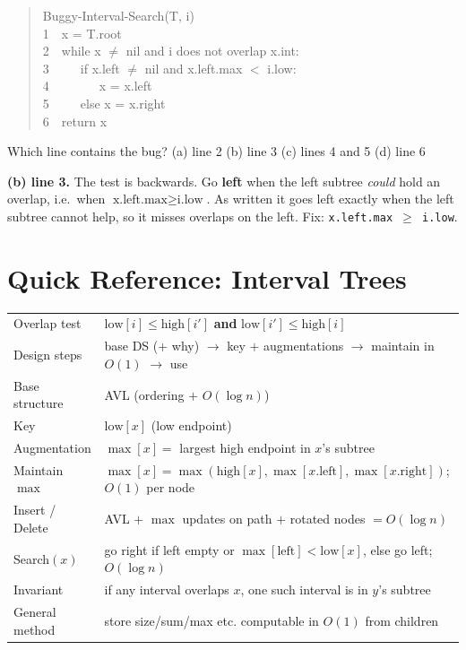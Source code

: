 \documentclass[11pt]{article}
\begin{document}
\begin{exambox}
\begin{quote}\ttfamily
Buggy-Interval-Search(T, i)\\
1\ \ x = T.root\\
2\ \ while x $\ne$ nil and i does not overlap x.int:\\
3\ \ \ \ \ if x.left $\ne$ nil and x.left.max $<$ i.low:\\
4\ \ \ \ \ \ \ \ x = x.left\\
5\ \ \ \ \ else x = x.right\\
6\ \ return x
\end{quote}
Which line contains the bug? \quad (a) line 2 \quad (b) line 3 \quad (c) lines 4 and 5 \quad (d) line 6

\begin{answerband}
\textbf{(b) line 3.} The test is backwards. Go \textbf{left} when the left subtree \emph{could} hold an overlap, i.e.\ when $\text{x.left.max}\geq\text{i.low}$. As written it goes left exactly when the left subtree cannot help, so it misses overlaps on the left. Fix: \texttt{x.left.max $\geq$ i.low}.
\end{answerband}
\end{exambox}

\section*{\textcolor{violetT}{Quick Reference: Interval Trees}}
\begin{keybox}
\renewcommand{\arraystretch}{1.4}
\begin{tabular}{l l}
Overlap test & $\text{low}[i] \le \text{high}[i']$ \textbf{and} $\text{low}[i'] \le \text{high}[i]$\\
Design steps & base DS (+ why) $\to$ key $+$ augmentations $\to$ maintain in $O(1)$ $\to$ use\\
Base structure & AVL (ordering $+$ $O(\log n)$)\\
Key & $\text{low}[x]$ (low endpoint)\\
Augmentation & $\max[x] = $ largest high endpoint in $x$'s subtree\\
Maintain $\max$ & $\max[x] = \max(\text{high}[x], \max[x.\text{left}], \max[x.\text{right}])$; $O(1)$ per node\\
Insert / Delete & AVL $+$ $\max$ updates on path $+$ rotated nodes $= O(\log n)$\\
Search$(x)$ & go right if left empty or $\max[\text{left}] < \text{low}[x]$, else go left; $O(\log n)$\\
Invariant & if any interval overlaps $x$, one such interval is in $y$'s subtree\\
General method & store size/sum/max etc. computable in $O(1)$ from children\\
\end{tabular}
\end{keybox}
\end{document}
